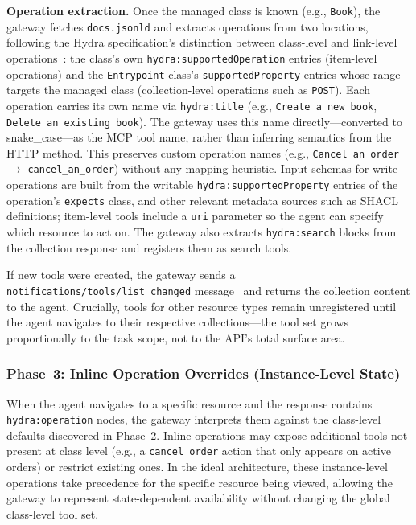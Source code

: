 \documentclass[11pt,a4paper]{article}
\begin{document}
\textbf{Operation extraction.} Once the managed class is known (e.g., \texttt{Book}), the gateway fetches \texttt{docs.jsonld} and extracts operations from two locations, following the Hydra specification's distinction between class-level and link-level operations~\cite[§5]{hydra}: the class's own \texttt{hydra:supportedOperation} entries (item-level operations) and the \texttt{Entrypoint} class's \texttt{supportedProperty} entries whose range targets the managed class (collection-level operations such as \texttt{POST}). Each operation carries its own name via \texttt{hydra:title} (e.g., \texttt{Create a new book}, \texttt{Delete an existing book}). The gateway uses this name directly---converted to snake\_case---as the MCP tool name, rather than inferring semantics from the HTTP method. This preserves custom operation names (e.g., \texttt{Cancel an order} $\to$ \texttt{cancel\_an\_order}) without any mapping heuristic. Input schemas for write operations are built from the writable \texttt{hydra:supportedProperty} entries of the operation's \texttt{expects} class, and other relevant metadata sources such as SHACL~\cite{shacl} definitions; item-level tools include a \texttt{uri} parameter so the agent can specify which resource to act on. The gateway also extracts \texttt{hydra:search} blocks from the collection response and registers them as search tools.

If new tools were created, the gateway sends a \texttt{notifications/tools/list\_changed} message~\cite{mcp-tools} and returns the collection content to the agent. Crucially, tools for other resource types remain unregistered until the agent navigates to their respective collections---the tool set grows proportionally to the task scope, not to the API's total surface area.

\subsubsection{Phase~3: Inline Operation Overrides (Instance-Level State)}

When the agent navigates to a specific resource and the response contains \texttt{hydra:operation} nodes, the gateway interprets them against the class-level defaults discovered in Phase~2. Inline operations may expose additional tools not present at class level (e.g., a \texttt{cancel\_order} action that only appears on active orders) or restrict existing ones. In the ideal architecture, these instance-level operations take precedence for the specific resource being viewed, allowing the gateway to represent state-dependent availability without changing the global class-level tool set.
\end{document}
